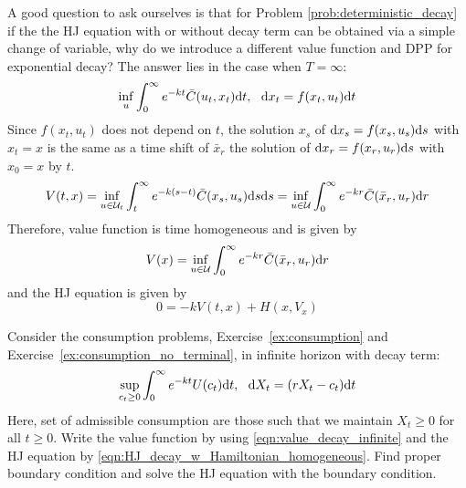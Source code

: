\documentclass[11pt]{book}
\newcommand{\dd}{\text{\normalfont d}}
\newcommand{\dt}{\text{\normalfont d}t}
\newcommand{\ds}{\text{\normalfont d}s}
\newcommand{\dr}{\text{\normalfont d}r}
\newcommand{\dx}{\text{\normalfont d}x}
\begin{document}
    A good question to ask ourselves is that for Problem \eqref{prob:deterministic_decay} if the the HJ equation with or without decay term can be obtained via a simple change of variable, why do we introduce a different value function and DPP for exponential decay?
    The answer lies in the case when $T=\infty$:
    \begin{equation}
    \label{prob:deterministic_decay_infinite}
        \inf_{u}\int_0^\infty e^{-k t}\bar{C}(u_t,x_t)\dt ,~~\dx_t=f(x_t,u_t)\dt
    \end{equation}
    Since $f(x_t,u_t)$ does not depend on $t$, the solution $x_s$ of ${\dx}_s=f(x_s,u_s){\ds}$ with $x_t=x$ is the same as a time shift of $\bar{x}_r$ the solution of ${\dx}_r=f(x_r,u_r){\ds}$ with $x_0=x$ by $t$.
    \[
        V(t,x)= \inf_{u\in\mathcal{U}_{t}}\int_t^\infty e^{-k(s-t)}\bar{C}(x_s,u_s){{\ds}}{{\ds}}=\inf_{u\in\mathcal{U}}\int_0^\infty e^{-kr}\bar{C}(\bar{x}_{r},u_{r}){{\dr}}
    \]
    Therefore, value function is time homogeneous
    and is given by
    \begin{equation} \label{eqn:value_decay_infinite}
    V(x)=\inf_{u\in\mathcal{U}}\int_0^\infty e^{-kr}\bar{C}(\bar{x}_{r},u_{r}){{\dr}}
    \end{equation}
    and the HJ equation is given by 
    \begin{equation} \label{eqn:HJ_decay_w_Hamiltonian_homogeneous}
                0=- k V(t,x)+H(x,V_x)            
    \end{equation}
    \begin{ex}
    Consider the consumption problems, Exercise~\ref{ex:consumption} and Exercise~\ref{ex:consumption_no_terminal}, in infinite horizon with decay term:
    \[
        {\sup_{c_t\ge0}}\int_0^\infty e^{-kt}U(c_t)\dt,~~\dd{X}_t = (rX_t - c_t)\dt
    \]
    Here, set of admissible consumption are those such that we maintain $X_t\ge0$ for all $t\ge0$. Write the value function by using \eqref{eqn:value_decay_infinite} and the HJ equation by \eqref{eqn:HJ_decay_w_Hamiltonian_homogeneous}. Find proper boundary condition and solve the HJ equation with the boundary condition.
    \end{ex}
        
\end{document}
